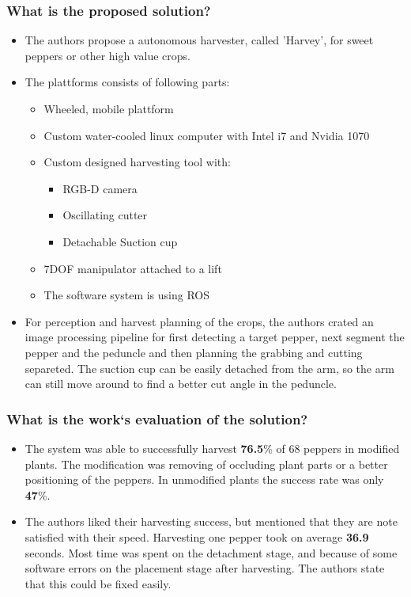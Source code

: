\subsubsection*{What is the proposed solution?}
\begin{itemize}
    \item The authors propose a autonomous harvester, called 'Harvey', for sweet peppers or other high value crops.
    \item The plattforms consists of following parts: \ \begin{itemize}
        \item Wheeled, mobile plattform
        \item Custom water-cooled linux computer with Intel i7 and Nvidia 1070
        \item Custom designed harvesting tool with: \ \begin{itemize}
            \item RGB-D camera
            \item Oscillating cutter
            \item Detachable Suction cup
        \end{itemize}
        \item 7DOF manipulator attached to a lift
        \item The software system is using ROS 
    \end{itemize} 
    \item For perception and harvest planning of the crops, the authors crated an image processing pipeline for first detecting a target pepper, next segment the pepper and the peduncle and then planning the grabbing and cutting separeted. The suction cup can be easily detached from the arm, so the arm can still move around to find a better cut angle in the peduncle.
\end{itemize}
\subsubsection*{What is the work`s evaluation of the solution?}
\begin{itemize}
    \item The system was able to successfully harvest \textbf{76.5}\% of 68 peppers in modified plants. The modification was removing of occluding plant parts or a better positioning of the peppers. In unmodified plants the success rate was only \textbf{47}\%.
    \item The authors liked their harvesting success, but mentioned that they are note satisfied with their speed. Harvesting one pepper took on average \textbf{36.9} seconds. Most time was spent on the detachment stage, and because of some software errors on the placement stage after harvesting. The authors state that this could be fixed easily.
\end{itemize}
